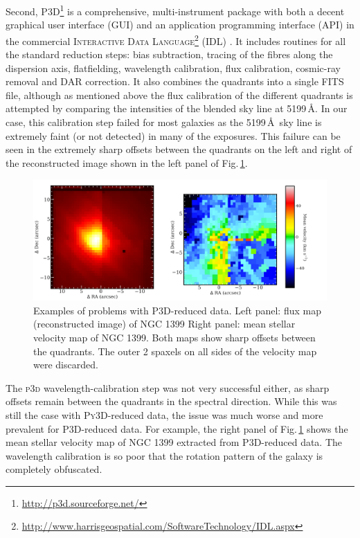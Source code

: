 		Second, \textsc{P3D}\footnote{\url{http://p3d.sourceforge.net/}} is a comprehensive, multi-instrument package with both a decent graphical user interface (GUI) and an application programming interface (API) in the commercial \textsc{Interactive Data Language}\footnote{\url{http://www.harrisgeospatial.com/SoftwareTechnology/IDL.aspx}} (\textsc{IDL}) \citep{Sandin2010, Sandin2011}. It includes routines for all the standard reduction steps: bias subtraction, tracing of the fibres along the dispersion axis, flatfielding, wavelength calibration, flux calibration, cosmic-ray removal and DAR correction. It also combines the quadrants into a single FITS file, although as mentioned above the flux calibration of the different quadrants is attempted by comparing the intensities of the blended sky line at 5199\,\AA. In our case, this calibration step failed for most galaxies as the 5199\,\AA\ sky line is extremely faint (or not detected) in many of the exposures. This failure can be seen in the extremely sharp offsets between the quadrants on the left and right of the reconstructed image shown in the left panel of Fig.\,\ref{fig:P3D}. 

		\begin{figure}
			\centering
			\includegraphics[width=.9\textwidth]{chapter2/P3D_NGC1399.png}
			\caption[\textsc{P3D}-reduced data problems]{Examples of problems with \textsc{P3D}-reduced data. Left panel: flux map (reconstructed image) of NGC 1399 Right panel: mean stellar velocity map of NGC 1399. Both maps show sharp offsets between the quadrants. The outer 2 spaxels on all sides of the velocity map were discarded.}
			\label{fig:P3D}
		\end{figure}


		The \textsc{p3d} wavelength-calibration step was not very successful either, as sharp offsets remain between the quadrants in the spectral direction. While this was still the case with \textsc{Py3D}-reduced data, the issue was much worse and more prevalent for \textsc{P3D}-reduced data. For example, the right panel of Fig.\,\ref{fig:P3D} shows the mean stellar velocity map of NGC 1399 extracted from \textsc{P3D}-reduced data. The wavelength calibration is so poor that the rotation pattern of the galaxy is completely obfuscated.

